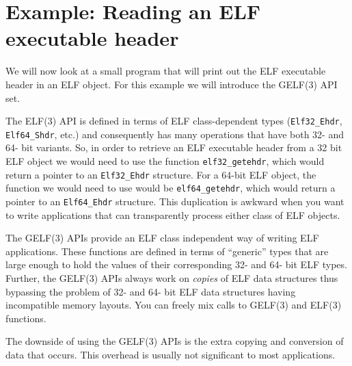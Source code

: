\documentclass[a4paper,pdftex]{book}
\newcommand{\function}[1]{\texttt{#1}}
\newcommand{\type}[1]{\texttt{#1}}
\begin{document}
\section{Example: Reading an ELF executable header}

We will now look at a small program that will print out the ELF
executable header in an ELF object. For this example we will introduce
the GELF(3) API set.%

The ELF(3) API is defined in terms of ELF class-dep\-endent types
(\type{Elf32\_\-Ehdr}, \type{Elf64\_\-Shdr}, etc.) and consequently
has many operations that have both 32- and 64- bit variants.  So, in
order to retrieve an ELF executable header from a 32 bit ELF object we
would need to use the function \function{elf32\_getehdr}, which would
return a pointer to an \type{Elf32\_Ehdr} structure.  For a 64-bit ELF
object, the function we would need to use would be
\function{elf64\_getehdr}, which would return a pointer to an
\type{Elf64\_Ehdr} structure.  This duplication is awkward when you
want to write applications that can transparently process either class
of ELF objects.%

The GELF(3) APIs provide an ELF class independent way of writing ELF
applications.  These functions are defined in terms of ``generic''
types that are large enough to hold the values of their corresponding
32- and 64- bit ELF types.  Further, the GELF(3) APIs always work on
\emph{copies} of ELF data structures thus bypassing the
problem of 32- and 64- bit ELF data structures having incompatible
memory layouts.  You can freely mix calls to GELF(3) and ELF(3)
functions.

The downside of using the GELF(3) APIs is the extra copying and
conversion of data that occurs.  This overhead is usually not
significant to most applications.%
\end{document}
